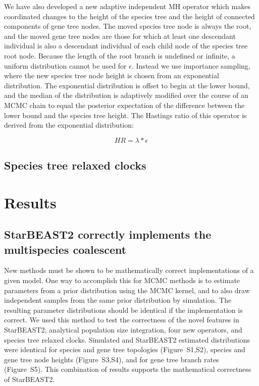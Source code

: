 \documentclass[12pt]{article}
\begin{document}
We have also developed a new adaptive independent MH \citep{Andrieu2008}
operator which makes coordinated changes to the height of the species tree and
the height of connected components of gene tree nodes. The moved species tree
node is always the root, and the moved gene tree nodes are those for which at
least one descendant individual is also a descendant individual of each child
node of the species tree root node. Because the length of the root branch is
undefined or infinite, a uniform distribution cannot be used for $\epsilon$.
Instead we use importance sampling, where the new species tree node height is
chosen from an exponential distribution. The exponential distribution is offset
to begin at the lower bound, and the median of the distribution is adaptively
modified over the course of an MCMC chain to equal the posterior expectation of
the difference between the lower bound and the species tree height. The Hastings
ratio of this operator is derived from the exponential distribution:

\begin{equation}
HR = \lambda * \epsilon
\end{equation}

\subsection{Species tree relaxed clocks}

\section{Results}

\subsection{StarBEAST2 correctly implements the multispecies coalescent}

New methods must be shown to be mathematically correct implementations of a
given model. One way to accomplish this for MCMC methods is to estimate
parameters from a prior distribution using the MCMC kernel, and to also draw
independent samples from the same prior distribution by simulation. The
resulting parameter distributions should be identical if the implementation is
correct. We used this method to test the correctness of the novel features in
StarBEAST2; analytical population size integration, four new operators, and
species tree relaxed clocks. Simulated and StarBEAST2 estimated distributions
were identical for species and gene tree topologies (Figure~S1,S2), species and
gene tree node heights (Figure~S3,S4), and for gene tree branch rates (Figure~S5).
This combination of results supports the mathematical correctness of StarBEAST2.
\end{document}

